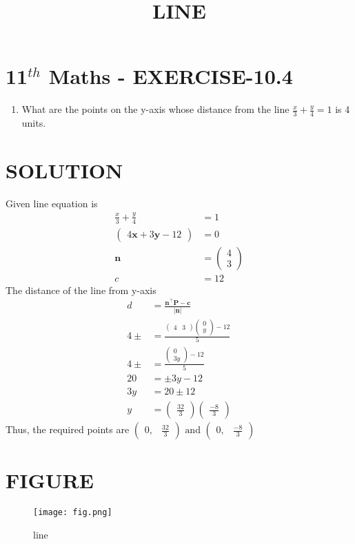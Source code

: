 \documentclass[12pt]{article}
\newcommand{\myvec}[1]{\ensuremath{\begin{pmatrix}#1\end{pmatrix}}}
\providecommand{\abs}[1]{\left\vert#1\right\vert}
\let\vec\mathbf
\begin{document}
\begin{center}
\title{\textbf{LINE}}
\date{\vspace{-5ex}} %
\maketitle
\end{center}

\section{11$^{th}$ Maths - EXERCISE-10.4}
\begin{enumerate}
\item What are the points on the y-axis whose distance from the line $\frac{x}{3}+\frac{y}{4}=1$ is 4 units.
\end{enumerate}
\section{SOLUTION}
Given line equation is
\begin{align}
\frac{x}{3}+\frac{y}{4}&=1\\
\myvec{4\vec{x}+3\vec{y}-12}&=0\\
\vec{n}&=\myvec{4\\3}\\
c&=12
\end{align}
The distance of the line from y-axis
\begin{align}
d&=\frac{\vec{n}^\top\vec{P}-\vec{c}}{\abs{\vec{n}}}\\
4\pm&=\frac{\myvec{4& 3}\myvec{0\\ y}-12}{5}\\
4\pm&=\frac{\myvec{0\\ 3y}-12}{5}\\
20&=\pm 3y-12\\
3y&=20\pm12\\
y&=\myvec{\frac{32}{3}} \myvec{\frac{-8}{3}}
\end{align}
Thus, the required points are $\myvec{0,& \frac{32}{3}}\text{ and }\myvec{0,& \frac{-8}{3}}$
\section{FIGURE}
\begin{figure}[h]
\centering
\texttt{[image: fig.png]}
\caption{line}
		\label{fig:Figure}
\end{figure}
\end{document}
